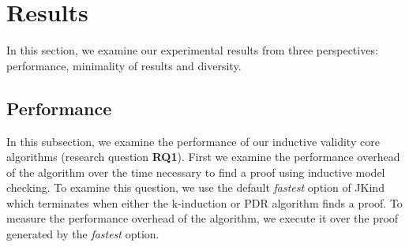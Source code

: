 \section{Results}
\label{sec:results}

\newcommand{\takeaway}[1]{
\vspace{6pt}
\noindent\fbox{\parbox{\columnwidth}{#1}}
\vspace{6pt}
}

In this section, we examine our experimental results from three perspectives: performance, minimality of \ucalg results and diversity.

\subsection{Performance}
\label{sec:performance}

In this subsection, we examine the performance of our inductive validity core algorithms (research question \textbf{RQ1}).  First we examine the performance overhead of the \ucalg algorithm over the time necessary to find a proof using inductive model checking.  To examine this question, we use the default {\em fastest} option of JKind which terminates when either the k-induction or PDR algorithm finds a proof.  To measure the performance overhead of the \ucalg algorithm, we execute it over the proof generated by the {\em fastest} option.

